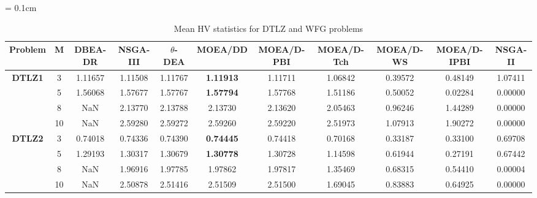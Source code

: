 \documentclass[conference]{IEEEtran}
\begin{document}
\begin{table*}[!htb]\scriptsize
	\centering
	\renewcommand{\arraystretch}{0.9}
	\caption{Mean HV statistics for DTLZ and WFG problems}
	\label{tab:HVunc}
	\tabcolsep = 0.1cm
	\begin{tabular}{|c|c|c|c|c|c|c|c|c|c|c|}
		\noalign{\smallskip}\hline
		\textbf{Problem}                & \textbf{M} & \textbf{DBEA-DR} & \textbf{NSGA-III} & \textbf{$\theta$-DEA} & \textbf{MOEA/DD} & \textbf{MOEA/D-PBI} & \textbf{MOEA/D-Tch} & \textbf{MOEA/D-WS} & \textbf{MOEA/D-IPBI} & \textbf{NSGA-II} \\ \hline
		\multirow{4}{*}{\textbf{DTLZ1}} & 3          & 1.11657          & 1.11508           & 1.11767               & \textbf{1.11913} & 1.11711             & 1.06842             & 0.39572            & 0.48149              & 1.07411          \\ \cline{2-11} 
		& 5          & 1.56068          & 1.57677           & 1.57767               & \textbf{1.57794} & 1.57768             & 1.51186             & 0.50052            & 0.02284              & 0.00000          \\ \cline{2-11} 
		& 8          & NaN              & 2.13770           & 2.13788               & 2.13730          & 2.13620             & 2.05463             & 0.96246            & 1.44289              & 0.00000          \\ \cline{2-11} 
		& 10         & NaN              & 2.59280           & 2.59272               & 2.59260          & 2.59220             & 2.51973             & 1.07913            & 1.90272              & 0.00000          \\ \hline
		\multirow{4}{*}{\textbf{DTLZ2}} & 3          & 0.74018          & 0.74336           & 0.74390               & \textbf{0.74445} & 0.74418             & 0.70168             & 0.33187            & 0.33100              & 0.69708          \\ \cline{2-11} 
		& 5          & 1.29193          & 1.30317           & 1.30679               & \textbf{1.30778} & 1.30728             & 1.14598             & 0.61944            & 0.27191              & 0.67442          \\ \cline{2-11} 
		& 8          & NaN              & 1.96916           & 1.97785               & 1.97862          & 1.97817             & 1.35469             & 0.68315            & 0.54410              & 0.00004          \\ \cline{2-11} 
		& 10         & NaN              & 2.50878           & 2.51416               & 2.51509          & 2.51500             & 1.69045             & 0.83883            & 0.64925              & 0.00000          \\ \hline

\end{tabular}
\end{table*}
\end{document}

